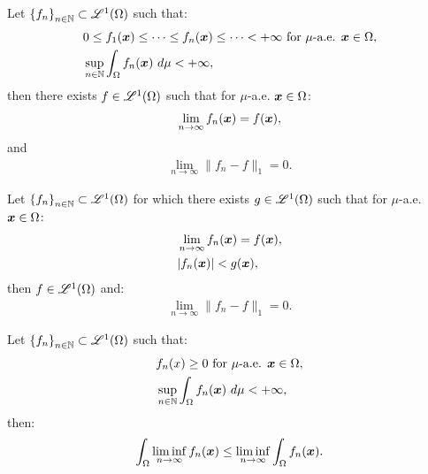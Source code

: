 \begin{theorem}
    Let $\left\{ f_n \right\}_{n \in \mathbb{N}} \subset \mathscr{L}^{1}(\Omega)$ such that:
    \begin{align}
        & 0 \leq f_1(\bm{x}) \leq \dots \leq f_n(\bm{x}) \leq \dots < +\infty \text{ for } \mu \text{-a.e. } \bm{x} \in \Omega, \\
        & \sup_{n \in \mathbb{N}} \int_\Omega f_n(\bm{x}) ~ d \mu < +\infty,
    \end{align}
    then there exists $f \in \mathscr{L}^{1}(\Omega)$ such that for $\mu$-a.e. $\bm{x} \in \Omega$:
    \begin{gather}
        \lim_{n \rightarrow \infty} f_n(\bm{x}) = f(\bm{x}),
    \end{gather}
    and
    \begin{gather}
        \lim_{n \rightarrow \infty} \lVert f_n - f \rVert_1 = 0.
    \end{gather}
\end{theorem}

\begin{theorem}
    Let $\left\{ f_n \right\}_{n \in \mathbb{N}} \subset \mathscr{L}^{1}(\Omega)$ for which there exists $g \in \mathscr{L}^{1}(\Omega)$ such that for $\mu$-a.e. $\bm{x} \in \Omega$:
    \begin{align}
        & \lim_{n \rightarrow \infty} f_n(\bm{x}) = f(\bm{x}), \\
        & \lvert f_n(\bm{x}) \rvert < g(\bm{x}),
    \end{align}
    then $f \in \mathscr{L}^{1}(\Omega)$ and:
    \begin{gather}
        \lim_{n \rightarrow \infty} \lVert f_n - f \rVert_1 = 0.
    \end{gather}
\end{theorem}

\begin{lemma}[Fatou]
    Let $\left\{ f_n \right\}_{n \in \mathbb{N}} \subset \mathscr{L}^{1}(\Omega)$ such that:
    \begin{align}
        & f_n(x) \geq 0 \text{ for } \mu \text{-a.e. } \bm{x} \in \Omega, \\
        & \sup_{n \in \mathbb{N}} \int_{\Omega} f_n(\bm{x}) ~ d \mu < +\infty,
    \end{align}
    then:
    \begin{gather}
        \int_{\Omega} \liminf_{n \rightarrow \infty} f_n(\bm{x}) \leq \liminf_{n \rightarrow \infty} \int_{\Omega} f_n(\bm{x}).
    \end{gather}
\end{lemma}

